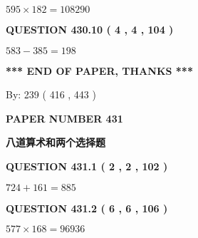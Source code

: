 \documentclass{ctexart}
\begin{document}
 

$ %
595 \times  %
182=   %
108290$
 
 
  
\vspace{0.2in}
  
{\textbf{\Large{QUESTION
430.10 
 ( 4 , 4 , 104 )
}}}
  
  
 
 

$ %
583 -  %
385=   %
198$
 
 
   
   
 \vspace{0.2in}
 
   
   
   
   
\vspace{1.0in} 
{\textbf{\large{ *** END OF PAPER, THANKS *** }}} 
   
   
\hspace{1.0in} By: 
 239 ( 416 ,  443 )
   
   
   
   
\newpage 
\setcounter{page}{ 
   431001 } 
   
   
   
   
 {\textbf{ \Large{ PAPER NUMBER  431  }}}
   
   
\vspace{0.2in}
   
   
   
   
   
   
 \vspace{0.2in}
{\LARGE {\textbf{ 八道算术和两个选择题}}}
   
   
  
\vspace{0.2in}
  
{\textbf{\Large{QUESTION
431.1 
 ( 2 , 2 , 102 )
}}}
  
  
 
 

$ %
724 +  %
161=   %
885$
 
 
  
\vspace{0.2in}
  
{\textbf{\Large{QUESTION
431.2 
 ( 6 , 6 , 106 )
}}}
  
  
 
 

$ %
577 \times  %
168=   %
96936$
 
\end{document}
